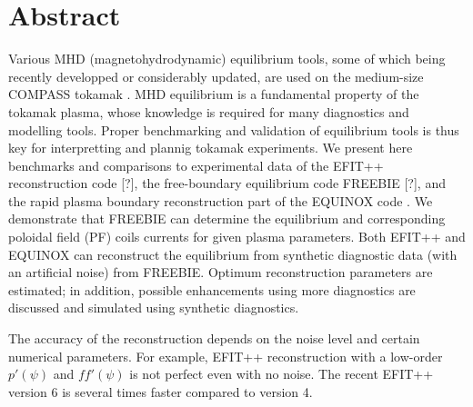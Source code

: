 \section{Abstract}

Various MHD (magnetohydrodynamic) equilibrium tools, some of which being recently developped or considerably updated, are used on the medium-size COMPASS tokamak \cite{P_nek_2006}. MHD equilibrium is a fundamental property of the tokamak plasma, whose knowledge is required for many diagnostics and modelling tools. Proper benchmarking and validation of equilibrium tools is thus key for interpretting and plannig tokamak experiments. We present here benchmarks and comparisons to experimental data of the EFIT++ reconstruction code [?], the free-boundary equilibrium code FREEBIE [?], and the rapid plasma boundary reconstruction part of the EQUINOX code \cite{doi:10.1016/j.jcp.2011.04.005}. We demonstrate that FREEBIE can determine the equilibrium and corresponding poloidal field (PF) coils currents for given plasma parameters. Both EFIT++ and EQUINOX can reconstruct the equilibrium from synthetic diagnostic data (with an artificial noise) from FREEBIE. Optimum reconstruction parameters are estimated; in addition, possible enhancements using more diagnostics are discussed and simulated using synthetic diagnostics.

The accuracy of the reconstruction depends on the noise level and certain numerical parameters. For example, EFIT++ reconstruction with a low-order $p'\left(\psi\right)$ and $ff'\left(\psi\right)$ is not perfect even with no noise. The recent EFIT++ version 6 is several times faster compared to version 4.